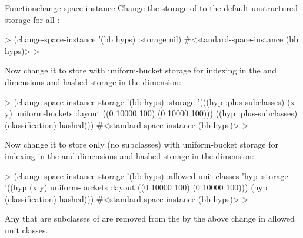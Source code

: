 \documentclass[10pt,twoside,english,pdftex]{article}
\begin{document}
\begin{functiondoc}{Function}{change-space-instance}{%
     
    \returns{} }
\fnexamples
%
Change the storage of   to the
default unstructured storage for all :
%
\W\supp
\begin{example}
  > (change-space-instance '(bb hyps) :storage nil)
  #<standard-space-instance (bb hyps)>
  >
\end{example}
%
Now change it to store   with uniform-bucket
storage for indexing in the  and  dimensions and hashed
storage in the  dimension:
%
\W\supp\notpretop
\begin{example}
  > (change-space-instance-storage '(bb hyps)
       :storage '(((hyp :plus-subclasses) (x y) 
                    uniform-buckets :layout ((0 10000 100)
                                             (0 10000 100)))
                  ((hyp :plus-subclasses) (classification) 
                    hashed)))
  #<standard-space-instance (bb hyps)>
  >
\end{example}
%
Now change it to store only   (no subclasses)
with uniform-bucket storage for indexing in the  and 
dimensions and hashed storage in the  dimension:
%
\W\supp\notpretop
\begin{example}
  > (change-space-instance-storage '(bb hyps)
       :allowed-unit-classes 'hyp     
       :storage '((hyp (x y) 
                   uniform-buckets :layout ((0 10000 100)
                                            (0 10000 100)))
                  (hyp (classification) hashed)))
  #<standard-space-instance (bb hyps)>
  > 
\end{example}
%
Any  that are subclasses of  are removed from
the   by the above change in
allowed unit classes.

\end{functiondoc}

\end{document}
